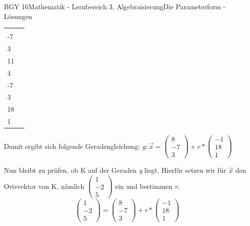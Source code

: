 \documentclass[oneside,openany,headings=optiontotoc,11pt,numbers=noenddot]{scrreprt}
\begin{document}
\begin{worksheet}{BGY 16}{Mathematik - Lernbereich 3, Algebraisierung}{Die Parameterform - Lösungen}
\begin{framed}
			\par\noindent
			\begin{tabularx}{\textwidth}{XX}
				\(\overrightarrow{OG} = \vec{G} -\vec{O} = \left(\begin{array}{c}8\\-7\\3\end{array}\right)\) & \(\overrightarrow{GH} = \vec{H} -\vec{G} = \left(\begin{array}{c}7\\11\\4\end{array}\right) - \left(\begin{array}{c}8\\-7\\3\end{array}\right) = \left(\begin{array}{c}-1\\18\\1\end{array}\right)\)
			\end{tabularx}
			Damit ergibt sich folgende Geradengleichung: \(g: \vec{x} = \left(\begin{array}{c}8\\-7\\3\end{array}\right) + r*\left(\begin{array}{c}-1\\18\\1\end{array}\right)\)\\
			\par\noindent
			Nun bleibt zu prüfen, ob K auf der Geraden \textit{g} liegt. Hierfür setzen wir für \(\vec{x}\)	den Ortsvektor von K, nämlich \(\left(\begin{array}{c}1\\-2\\5\end{array}\right)\) ein und bestimmen \textit{r}.\\
			\[\left(\begin{array}{c}1\\-2\\5\end{array}\right) = \left(\begin{array}{c}8\\-7\\3\end{array}\right) + r*\left(\begin{array}{c}-1\\18\\1\end{array}\right)\]

\end{framed}
\end{worksheet}
\end{document}
